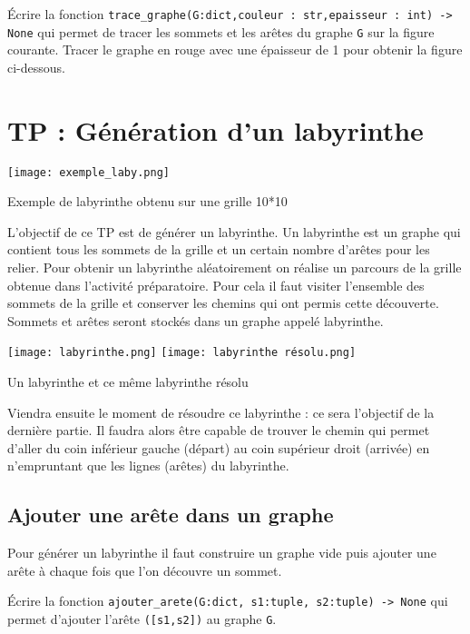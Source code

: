 \begin{question}
Écrire la fonction \lstinline{trace_graphe(G:dict,couleur : str,epaisseur : int) -> None} qui permet de tracer les sommets et les arêtes du graphe \lstinline{G} sur la figure courante. Tracer le graphe en rouge avec une épaisseur de 1 pour obtenir la figure ci-dessous.
\end{question}

\newpage
\section*{TP : Génération d'un labyrinthe}

\begin{marginfigure}
\texttt{[image: exemple\_laby.png]}
\caption{Exemple de labyrinthe obtenu sur une grille 10*10}
\end{marginfigure}


L'objectif de ce TP est de générer un labyrinthe. Un labyrinthe est un graphe qui contient tous les sommets de la grille et un certain nombre d'arêtes pour les relier.
Pour obtenir un labyrinthe aléatoirement on réalise un parcours de la grille obtenue dans l'activité préparatoire.
Pour cela il faut visiter l'ensemble des sommets de la grille et conserver les chemins qui ont permis cette découverte. Sommets et arêtes seront stockés dans un graphe appelé labyrinthe.


\begin{marginfigure}\centering
	\texttt{[image: labyrinthe.png]}
            \texttt{[image: labyrinthe résolu.png]}            
\caption{Un labyrinthe et ce même labyrinthe résolu}
\end{marginfigure}


Viendra ensuite le moment de résoudre ce labyrinthe : ce sera l'objectif de la dernière partie. Il faudra alors être capable de trouver le chemin qui permet d'aller du coin inférieur gauche (départ) au coin supérieur droit (arrivée) en n'empruntant que les lignes (arêtes) du labyrinthe. 

\subsection*{Ajouter une arête dans un graphe}
Pour générer un labyrinthe il faut construire un graphe vide puis ajouter une arête à chaque fois que l'on découvre un sommet.



\begin{question}
Écrire la fonction \lstinline{ajouter_arete(G:dict, s1:tuple, s2:tuple) -> None} qui permet d'ajouter l'arête \lstinline{([s1,s2])} au graphe \lstinline{G}. 
\end{question}

